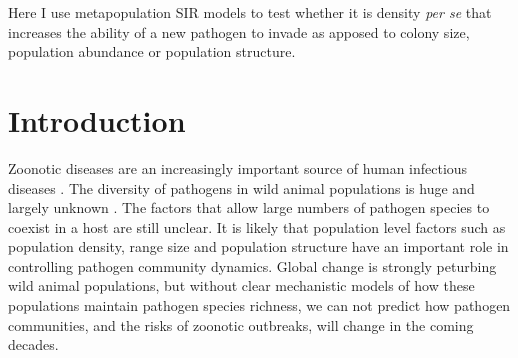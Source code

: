 Here I use metapopulation SIR models to test whether it is density \emph{per se} that increases the ability of a new pathogen to invade as apposed to colony size, population abundance or population structure.














\section{Introduction}






Zoonotic diseases are an increasingly important source of human infectious diseases \cite{jones2008global, woolhouse2006host, taylor2001risk}.
The diversity of pathogens in wild animal populations is huge and largely unknown \cite{poulin2014parasite}.
The factors that allow large numbers of pathogen species to coexist in a host \cite{anthony2013strategy, anthony2013strategy} are still unclear.
It is likely that population level factors such as population density, range size and population structure have an important role in controlling pathogen community dynamics.
Global change is strongly peturbing wild animal populations, but without clear mechanistic models of how these populations maintain pathogen species richness, we can not predict how pathogen communities, and the risks of zoonotic outbreaks, will change in the coming decades.





